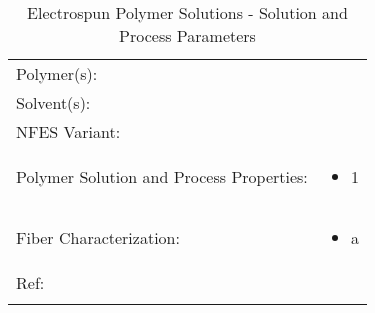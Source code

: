 \begin{table}[th]
\caption{Electrospun Polymer Solutions - Solution and Process Parameters}
\begin{center}
\begin{tabular}{
>{\raggedright\arraybackslash}p{}
>{\raggedright\arraybackslash}p{} }

\hline
Polymer(s): &
 \\

\arrayrulecolor{lightgray}\hline
Solvent(s): &
 \\

\hline
NFES Variant: &
 \\

\hline
Polymer Solution and Process Properties: &
\begin{itemize}[leftmargin=*]
\item 1
\end{itemize} \\

\hline
Fiber Characterization: &
\begin{itemize}[leftmargin=*]
\item a
\end{itemize} \\

\hline
Ref: & \cite{Bisht2011} \\
\arrayrulecolor{black}\hline
\label{tbl:FloresCompare}
\end{tabular}
\end{center}
\end{table}






